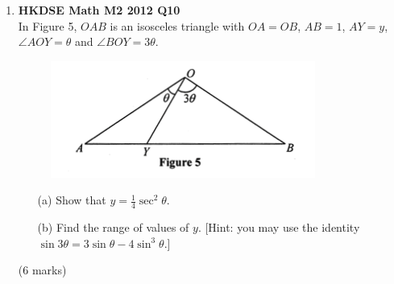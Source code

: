 \documentclass[12pt]{article}
\begin{document}
\begin{enumerate}
	\item \textbf{HKDSE Math M2 2012 Q10}\\
	In Figure 5, $OAB$ is an isosceles triangle with $OA = OB$, $AB = 1$, $AY = y$, $\angle AOY = \theta$ and $\angle BOY = 3\theta$. 
	\begin{figure}[H]
		\centering
		\includegraphics[width = .5\linewidth]{2012Figure5}
	\end{figure}
	\begin{enumerate}
		\item [(a)]Show that $y = \displaystyle\frac{1}{4}\sec^2{\theta}$.
		\item [(b)]Find the range of values of $y$. [Hint: you may use the identity $\sin{3\theta} = 3\sin{\theta} - 4\sin^3{\theta}$.]
	\end{enumerate}
	(6 marks)


\end{enumerate}
\end{document}
